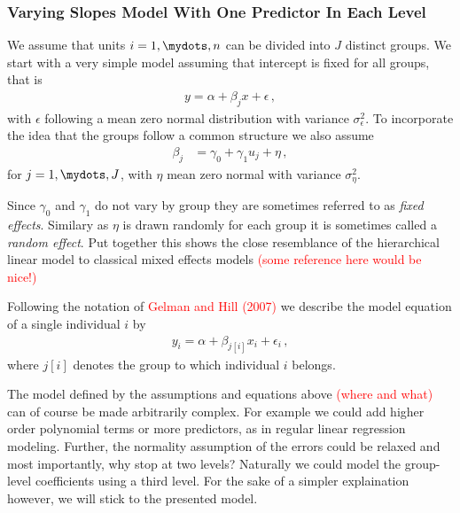 \subsubsection{Varying Slopes Model With One Predictor In Each Level}
We assume that units $i = 1,\mydots,n$ can be divided into $J$ distinct groups.
We start with a very simple model assuming that intercept is fixed for all
groups, that is
\begin{align}
  y = \alpha + \beta_j x + \epsilon \,,
\end{align}
with $\epsilon$ following a mean zero normal distribution with variance
$\sigma_{\epsilon}^2$.
To incorporate the idea that the groups follow a common structure we also
assume
\begin{align}
  \beta_j &= \gamma_0 + \gamma_1 u_j + \eta \,,
\end{align}
for $j = 1,\mydots,J$, with $\eta$ mean zero normal with variance $\sigma_\eta^2$.

Since $\gamma_0$ and $\gamma_1$ do not vary by group they are sometimes referred
to as \emph{fixed effects}. Similary as $\eta$ is drawn randomly for each group
it is sometimes called a \emph{random effect}. Put together this shows the close
resemblance of the hierarchical linear model to classical mixed effects models
\textcolor{red}{(some reference here would be nice!)}

Following the notation of \textcolor{red}{Gelman and Hill (2007)} we describe the
model equation of a single individual $i$ by
\begin{align}
  y_i = \alpha + \beta_{j[i]} x_i + \epsilon_i \,,
\end{align}
where $j[i]$ denotes the group to which individual $i$ belongs.

The model defined by the assumptions and equations above \textcolor{red}{(where and what)} can of course be made
arbitrarily complex. For example we could add higher order polynomial terms or
more predictors, as in regular linear regression modeling. Further, the
normality assumption of the errors could be relaxed and most importantly, why
stop at two levels? Naturally we could model the group-level coefficients using
a third level. For the sake of a simpler explaination however, we will stick to
the presented model.

